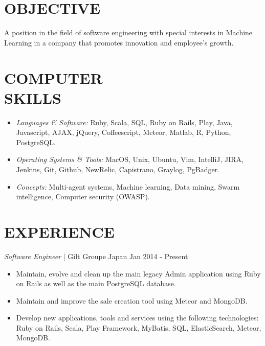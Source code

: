 \documentclass[line, margin]{res}
\begin{document}
\address{ 151-0051 Tokyo, Shibuya, Sendagaya 3-7-8 Urbanex Harajuku 605 }
\address{ abalonperin1@gmail.com | https://linkedin.com/in/abalonperin | https://github.com/zolrag13 }
 
\begin{resume}
 
\section{OBJECTIVE} A position in the field of software engineering with special interests in Machine Learning in a
company that promotes innovation and employee's growth. 
 
\section{COMPUTER \\ SKILLS}
                 \begin{itemize} %
                  \item {\sl Languages \& Software:} Ruby, Scala, SQL, Ruby on Rails, Play, Java, Javascript, AJAX, jQuery, Coffeescript, Meteor, Matlab, R, Python, PostgreSQL.
                  \item {\sl Operating Systems \& Tools:} MacOS, Unix, Ubuntu, Vim, IntelliJ, JIRA, Jenkins, Git,
                    Github, NewRelic, Capistrano, Graylog, PgBadger.
                  \item {\sl Concepts:} Multi-agent systems, Machine learning, Data mining, Swarm intelligence, Computer security (OWASP).
                \end{itemize}
 
\section{EXPERIENCE} {\sl Software Engineer} | Gilt Groupe Japan \hfill Jan 2014 - Present\\
                 \begin{itemize} %
                  \item  Maintain, evolve and clean up the main legacy Admin application using Ruby on Rails as well as the main PostgreSQL database.
                  \item  Maintain and improve the sale creation tool using Meteor and MongoDB.
                  \item  Develop new applications, tools and services using the following technologies: Ruby on Rails, Scala, Play Framework, MyBatis, SQL, ElasticSearch, Meteor, MongoDB.
                 \end{itemize}
 

\end{resume}
\end{document}
